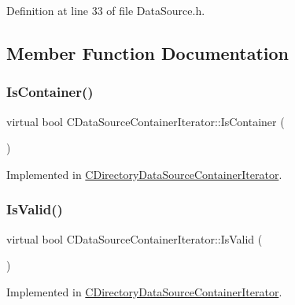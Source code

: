 Definition at line 33 of file Data\+Source.\+h.



\subsection{Member Function Documentation}
\hypertarget{classCDataSourceContainerIterator_aafcccb5733f936b03e1930b09c02df87}{}\label{classCDataSourceContainerIterator_aafcccb5733f936b03e1930b09c02df87} 
\subsubsection{\texorpdfstring{Is\+Container()}{IsContainer()}}
{\footnotesize\ttfamily virtual bool C\+Data\+Source\+Container\+Iterator\+::\+Is\+Container (\begin{DoxyParamCaption}{ }\end{DoxyParamCaption})\hspace{0.3cm}{\ttfamily [pure virtual]}}



Implemented in \hyperlink{classCDirectoryDataSourceContainerIterator_a5430df3036bfd75734ffb807b888b208}{C\+Directory\+Data\+Source\+Container\+Iterator}.

\hypertarget{classCDataSourceContainerIterator_ad1e2a9c6bde2f80ed03cb45085ce0441}{}\label{classCDataSourceContainerIterator_ad1e2a9c6bde2f80ed03cb45085ce0441} 
\subsubsection{\texorpdfstring{Is\+Valid()}{IsValid()}}
{\footnotesize\ttfamily virtual bool C\+Data\+Source\+Container\+Iterator\+::\+Is\+Valid (\begin{DoxyParamCaption}{ }\end{DoxyParamCaption})\hspace{0.3cm}{\ttfamily [pure virtual]}}



Implemented in \hyperlink{classCDirectoryDataSourceContainerIterator_ab89d8af808bff115ac7c096bbec23188}{C\+Directory\+Data\+Source\+Container\+Iterator}.

